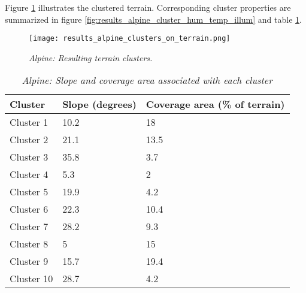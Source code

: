 Figure \ref{fig:results_alpine_terrain_clusters} illustrates the clustered terrain. Corresponding cluster properties are summarized in figure \ref{fig:results_alpine_cluster_hum_temp_illum} and table \ref{tab:results_alpine_cluster_slope_covarea}. 

\begin{figure}[htb!]
\center
	\texttt{[image: results\_alpine\_clusters\_on\_terrain.png]}
	\caption{\textit{Alpine: Resulting terrain clusters.}}
	\label{fig:results_alpine_terrain_clusters}
\end{figure}

\begin{table}[htb!]
  \centering
	    \begin{tabular}{|p{5cm}|p{5cm}|p{5cm}|}
		\hline	
  	    Cluster & \textbf{Slope (degrees)} & \textbf{Coverage area (\% of terrain)} \\
  	    \hline	
		Cluster 1 & 10.2 & 18 \\
		\hline
		Cluster 2 & 21.1 & 13.5 \\
		\hline
		Cluster 3 & 35.8 & 3.7 \\
		\hline
		Cluster 4 & 5.3 & 2 \\
		\hline
		Cluster 5 & 19.9 & 4.2 \\
		\hline
		Cluster 6 & 22.3 & 10.4 \\
		\hline
		Cluster 7 & 28.2 & 9.3 \\
		\hline
		Cluster 8 & 5 & 15 \\
		\hline
		Cluster 9 & 15.7 & 19.4 \\
		\hline
		Cluster 10 & 28.7 & 4.2 \\
		\hline
		\end{tabular}
		\caption{\textit{Alpine: Slope and coverage area associated with each cluster}}
	  \label{tab:results_alpine_cluster_slope_covarea}
\end{table}

